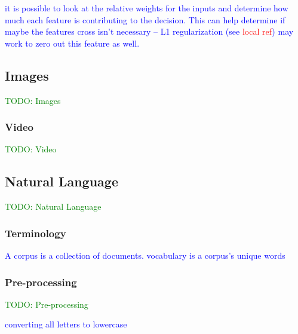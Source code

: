 \textcolor{blue}{it is possible to look at the relative weights for the inputs and determine how much each feature is contributing to the decision. This can help determine if maybe the features cross isn't necessary -- L1 regularization (see \textcolor{red}{local ref}) may work to zero out this feature as well.}



\subsection{Images}

\textcolor{green}{TODO: Images}


\subsubsection{Video}

\textcolor{green}{TODO: Video}


\subsection{Natural Language}

\textcolor{green}{TODO: Natural Language}

\subsubsection{Terminology}

\textcolor{blue}{A {corpus} is a collection of documents. {vocabulary} is a corpus's unique words}

\subsubsection{Pre-processing}

\textcolor{green}{TODO: Pre-processing}

\textcolor{blue}{converting all letters to lowercase}


